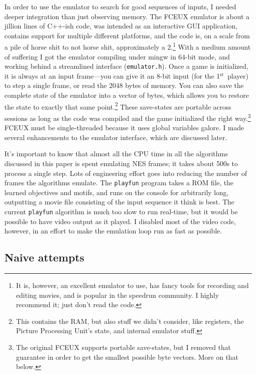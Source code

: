 \documentclass[twocolumn]{article}
\newcommand\st{$^{\mathrm{st}}$}
\begin{document}
In order to use the emulator to search for good sequences of inputs, I
needed deeper integration than just observing memory. The FCEUX
emulator is about a jillion lines of C++-ish code, was intended as an
interactive GUI application, contains support for multiple different
platforms, and the code is, on a scale from a pile of horse shit to
not horse shit, approximately a 2.\footnote{It is, however, an
  excellent emulator to use, has fancy tools for recording and editing
  movies, and is popular in the speedrun community. I highly recommend
  it; just don't read the code.} With a medium amount of suffering I
got the emulator compiling under mingw in 64-bit mode, and working
behind a streamlined interface ({\tt emulator.h}). Once a game is
initialized, it is always at an input frame---you can give it an 8-bit
input (for the 1\st\ player) to step a single frame, or read the 2048
bytes of memory. You can also save the complete state of the emulator
into a vector of bytes, which allows you to restore the state to
exactly that same point.\footnote{This contains the RAM, but also
  stuff we didn't consider, like registers, the Picture Processing
  Unit's state, and internal emulator stuff.} These save-states are
portable across sessions as long as the code was compiled and the game
initialized the right way.\footnote{The original FCEUX supports
  portable save-states, but I removed that guarantee in order to get
  the smallest possible byte vectors. More on that below.} FCEUX must
be single-threaded because it uses global variables galore. I made
several enhancements to the emulator interface, which are discussed
later.

It's important to know that almost all the CPU time in all the
algorithms discussed in this paper is spent emulating NES frames; it
takes about 500\textmu s to process a single step. Lots of engineering
effort goes into reducing the number of frames the algorithms emulate.
The {\tt playfun} program takes a ROM file, the learned objectives and
motifs, and runs on the console for arbitrarily long, outputting a
movie file consisting of the input sequence it think is best. The
current {\tt playfun} algorithm is much too slow to run real-time, but
it would be possible to have video output as it played. I disabled
most of the video code, however, in an effort to make the emulation
loop run as fast as possible.

\subsection{Naive attempts} \label{sec:naive}
\end{document}
